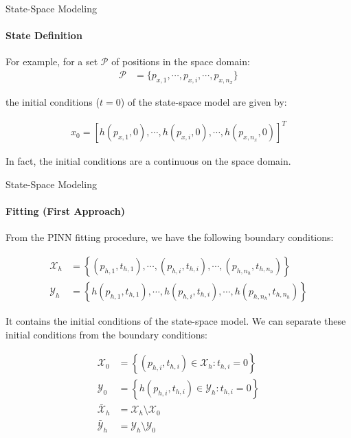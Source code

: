 \begin{frame}{State-Space Modeling}
\framesubtitle{State Definition}

For example, for a set $\mathcal{P}$ of positions in the space domain:
\begin{align}
\mathcal{P} &= \{p_{x,1},\cdots, p_{x,i}, \cdots, p_{x,n_x}\}
\end{align}

the initial conditions ($t=0$) of the state-space model are given by:

\begin{align}
x_0 = \left[h(p_{x,1}, 0), \cdots,h(p_{x,i}, 0), \cdots, h(p_{x,n_x}, 0) \right]^T
\end{align}

In fact, the initial conditions are a continuous on the space domain. 
\end{frame}

\begin{frame}{State-Space Modeling}
\framesubtitle{Fitting (First Approach)}

From the PINN fitting procedure, we have the following boundary conditions:

\begin{align*}
    \mathcal{X}_h &= \left\{
        \left(p_{h,1}, t_{h,1}\right),
        \cdots,
        \left(p_{h,i}, t_{h,i}\right),
        \cdots,
        \left(p_{h,n_h}, t_{h,n_h}\right)
    \right\}\\
    \mathcal{Y}_h &= \left\{
        h\left(p_{h,1}, t_{h,1}\right),
        \cdots,
        h\left(p_{h,i}, t_{h,i}\right),
        \cdots,
        h\left(p_{h,n_h}, t_{h,n_h}\right)
    \right\}
\end{align*}

It contains the initial conditions of the state-space model. We can separate these initial conditions from the boundary conditions:

\begin{align}
    \mathcal{X}_0 &= \left\{
        (p_{h,i}, t_{h,i}) \in \mathcal{X}_h: t_{h,i} = 0
    \right\}\\
    \mathcal{Y}_0 &= \left\{
        h(p_{h,i}, t_{h,i}) \in \mathcal{Y}_h: t_{h,i} = 0
    \right\}\\
    \bar{\mathcal{X}}_h &= \mathcal{X}_h \setminus \mathcal{X}_0\\
    \bar{\mathcal{Y}}_h &= \mathcal{Y}_h \setminus \mathcal{Y}_0 
\end{align}
\end{frame}

